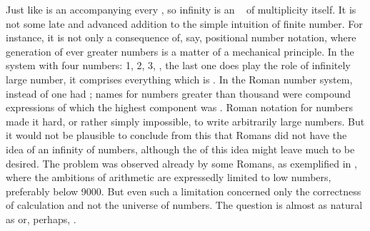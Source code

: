 Just like  is an  accompanying every
, so infinity is an \equi\  of multiplicity itself. It
is not some late and advanced addition to the simple intuition of finite number.
For instance, it is not only a consequence of, say, positional number notation,
where generation of ever greater numbers is a matter of a mechanical principle.
In the system with four numbers: 1, 2, 3, , the last one does play the
role of infinitely large number, it comprises everything which is . In the Roman number system, instead of  one had ;
names for numbers greater than thousand were compound expressions of which the
highest component was . Roman notation for numbers made it hard, or
rather simply impossible, to write arbitrarily large numbers. But it
would not be plausible to conclude from this that Romans did not have the idea
of an infinity of numbers, although the  of this idea might leave
much to be desired.  The problem was observed already by some Romans, as
exemplified in \citeauthor*{Arithmetica}, where the ambitions of arithmetic are
expressedly limited to low numbers, preferably below 9000. But even such a
limitation concerned only the correctness of calculation and not the universe of
numbers.  The question   is almost as natural
as  or, perhaps, .


